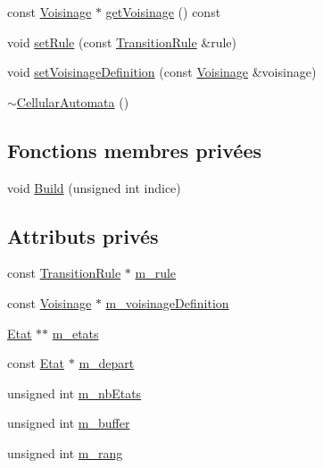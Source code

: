 \begin{DoxyCompactItemize}
\item 
const \mbox{\hyperlink{class_voisinage}{Voisinage}} $\ast$ \mbox{\hyperlink{class_cellular_automata_a6b579ee2708d749ec4073950d3593083}{get\+Voisinage}} () const
\item 
void \mbox{\hyperlink{class_cellular_automata_a894e9aaca0bae53d59494aab600bb11d}{set\+Rule}} (const \mbox{\hyperlink{class_transition_rule}{Transition\+Rule}} \&rule)
\item 
void \mbox{\hyperlink{class_cellular_automata_aaa2d03eaa7b1b5349d67393fcad0a7fa}{set\+Voisinage\+Definition}} (const \mbox{\hyperlink{class_voisinage}{Voisinage}} \&voisinage)
\item 
\mbox{\hyperlink{class_cellular_automata_a50e6daa1b843aeb3bcafc634ae219ed8}{$\sim$\+Cellular\+Automata}} ()
\end{DoxyCompactItemize}
\subsection*{Fonctions membres privées}
\begin{DoxyCompactItemize}
\item 
void \mbox{\hyperlink{class_cellular_automata_ad0c57645f11882d3290e6493f4773c3c}{Build}} (unsigned int indice)
\end{DoxyCompactItemize}
\subsection*{Attributs privés}
\begin{DoxyCompactItemize}
\item 
const \mbox{\hyperlink{class_transition_rule}{Transition\+Rule}} $\ast$ \mbox{\hyperlink{class_cellular_automata_aac41608d613ea2ee9df3a55ad0a127f6}{m\+\_\+rule}}
\item 
const \mbox{\hyperlink{class_voisinage}{Voisinage}} $\ast$ \mbox{\hyperlink{class_cellular_automata_a6990374e6bca2e228ff82ad5a3419833}{m\+\_\+voisinage\+Definition}}
\item 
\mbox{\hyperlink{class_etat}{Etat}} $\ast$$\ast$ \mbox{\hyperlink{class_cellular_automata_aed4b142d4bbd1af6ea66db5c4b03cc9d}{m\+\_\+etats}}
\item 
const \mbox{\hyperlink{class_etat}{Etat}} $\ast$ \mbox{\hyperlink{class_cellular_automata_abfc701e73635828d67d45bdb8926440e}{m\+\_\+depart}}
\item 
unsigned int \mbox{\hyperlink{class_cellular_automata_a75bbb557cc4e2056da5265f242185e0a}{m\+\_\+nb\+Etats}}
\item 
unsigned int \mbox{\hyperlink{class_cellular_automata_a8d2cab9f275061f595fab6a12f8c84d9}{m\+\_\+buffer}}
\item 
unsigned int \mbox{\hyperlink{class_cellular_automata_ac6d05bb0d1a0696c83253257f1047f8e}{m\+\_\+rang}}
\end{DoxyCompactItemize}


